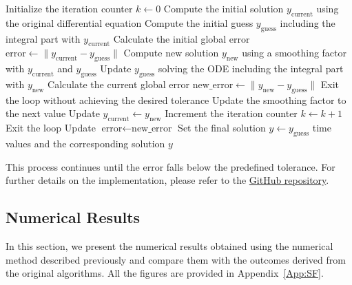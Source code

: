 \documentclass{article} %
\begin{document}
\begin{algorithm}[h!]
    \caption{Iterative Modified IDESolver Method}
    \label{alg:IDESolver}
    \begin{algorithmic}[1]
    \State Initialize the iteration counter $k \gets 0$
    \State Compute the initial solution $y_{\text{current}}$ using the original differential equation
    \State Compute the initial guess $y_{\text{guess}}$ including the integral part with $y_{\text{current}}$
    \State Calculate the initial global error $\text{error} \gets \| y_{\text{current}} - y_{\text{guess}} \|$
        \State Compute new solution $y_{\text{new}}$ using a smoothing factor with $y_{\text{current}}$ and $y_{\text{guess}}$
        \State Update $y_{\text{guess}}$ solving the ODE including the integral part with $y_{\text{new}}$
        \State Calculate the current global error $\text{new\_error} \gets \| y_{\text{new}} - y_{\text{guess}} \|$
                \State Exit the loop without achieving the desired tolerance
            \Else
                \State Update the smoothing factor to the next value
            \EndIf
        \EndIf
        \State Update $y_{\text{current}} \gets y_{\text{new}}$
        \State Increment the iteration counter $k \gets k + 1$
            \State Exit the loop
        \EndIf
        \State Update $\text{error} \gets \text{new\_error}$
    \EndWhile
    \State Set the final solution $y \gets y_{\text{guess}}$
    \State \Return time values and the corresponding solution $y$
    \end{algorithmic}
    \end{algorithm}

This process continues until the error falls below the predefined tolerance. For further details on the implementation, please refer to the \href{https://github.com/carlosherediapimienta/numerical_simulations_nonlocal}{GitHub repository}.

\subsection{Numerical Results}\label{subsec:Numerical}
In this section, we present the numerical results obtained using the numerical method described previously and compare them with the outcomes derived from the original algorithms. All the figures are provided in Appendix~\ref{App:SF}.
\end{document}
